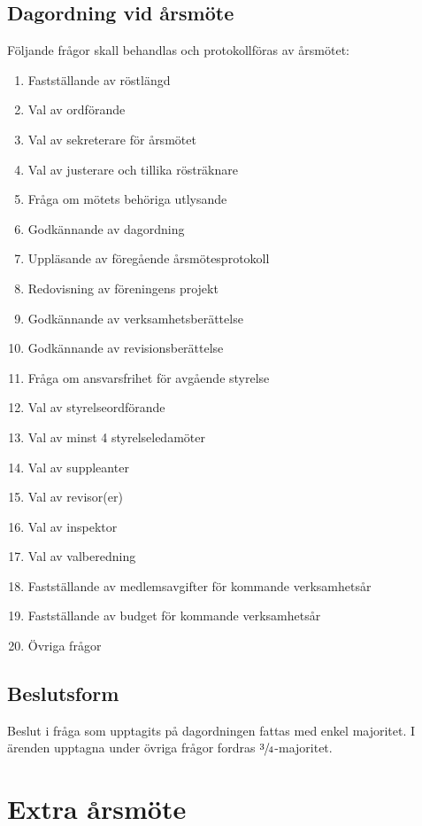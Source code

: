 \documentclass[11pt,a4paper]{article}
\begin{document}
\subsection{Dagordning vid årsmöte}
Följande frågor skall behandlas och protokollföras av årsmötet:
\begin{enumerate}
\item Fastställande av röstlängd
\item Val av ordförande
\item Val av sekreterare för årsmötet
\item Val av justerare och tillika rösträknare
\item Fråga om mötets behöriga utlysande
\item Godkännande av dagordning
\item Uppläsande av föregående årsmötes{}protokoll%
\item Redovisning av föreningens projekt
\item Godkännande av verksamhetsberättelse
\item Godkännande av revisionsberättelse
\item Fråga om ansvarsfrihet för avgående styrelse
\item Val av styrelseordförande
\item Val av minst 4 styrelseledamöter
\item Val av suppleanter
\item Val av revisor(er)
\item Val av inspektor
\item Val av valberedning
\item Fastställande av medlemsavgifter för kommande verksamhetsår
\item Fastställande av budget för kommande verksamhetsår
\item Övriga frågor
\end{enumerate}
\subsection{Beslutsform}
Beslut i fråga som upptagits på dagordningen fattas med enkel majoritet. I ärenden upptagna under övriga frågor fordras \(\sfrac{3}{4}\)-majoritet.





\section{Extra årsmöte}
\end{document}
